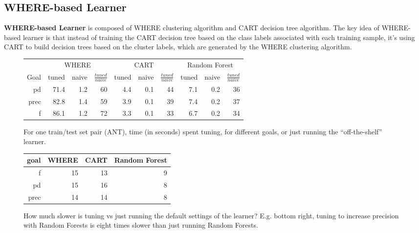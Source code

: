  \subsection{WHERE-based Learner}
\textbf{WHERE-based Learner} is composed of WHERE clustering algorithm and CART 
decision tree algorithm. The key idea of WHERE-based learner is that  instead of training the 
CART decision tree based on the class labels associated with each training sample, it's using 
CART to build decision trees based on the cluster labels, which are generated by the WHERE 
clustering algorithm.
 
 
 
\begin{figure}[!t]

\renewcommand{\baselinestretch}{0.8}
\scriptsize
\centering
  \begin{tabular}{r@{~}|r@{~}rr|r@{~}rr|r@{~}rr}
    & \multicolumn{3}{c|}{WHERE}&\multicolumn{3}{c|}{CART}& \multicolumn{3}{c}{Random Forest}\\\cline{2-10} 
    Goal & tuned & naive &$\frac{\mathit{tuned}}{\mathit{naive}}$& tuned & naive &$\frac{\mathit{tuned}}{\mathit{naive}}$& tuned & naive&$\frac{\mathit{tuned}}{\mathit{naive}}$\\\hline
pd&71.4&1.2&60&4.4&0.1&44&7.1&0.2&36\\ 
prec&82.8&1.4&59&3.9&0.1&39&7.4&0.2&37\\
f&86.1&1.2&72&3.3&0.1&33&6.7&0.2&34
  \end{tabular}
  \caption{For one train/test set pair (ANT),  time (in seconds) spent tuning,
  for different goals, or just running the ``off-the-shelf'' learner.}
\end{figure}


\begin{figure}[!t]

\renewcommand{\baselinestretch}{0.8}
\scriptsize
\centering
\begin{tabular}{r|rrr}
goal &	WHERE	&CART&	Random Forest\\\hline
f	&15	&13	&9\\ 
pd	&15	&16	&8\\ 
prec&	14	&14	&8
\end{tabular}
\caption{How much slower is tuning vs just running the default
settings of the learner? E.g. bottom right, tuning to increase
precision with Random Forests is eight times slower than
just running Random Forests.}
\end{figure}



